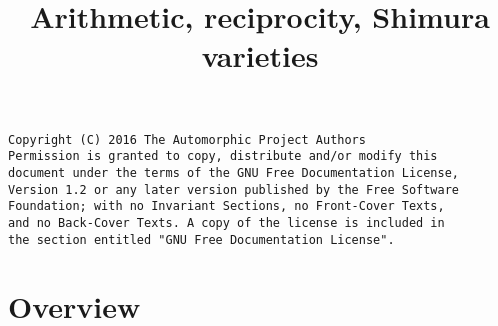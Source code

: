 

%


\title{Arithmetic, reciprocity, Shimura varieties}


\maketitle

\label{section-phantom}

\begin{verbatim}
Copyright (C) 2016 The Automorphic Project Authors
Permission is granted to copy, distribute and/or modify this
document under the terms of the GNU Free Documentation License,
Version 1.2 or any later version published by the Free Software
Foundation; with no Invariant Sections, no Front-Cover Texts,
and no Back-Cover Texts. A copy of the license is included in
the section entitled "GNU Free Documentation License".
\end{verbatim}

\tableofcontents


\section{Overview}
\label{section-overview}







